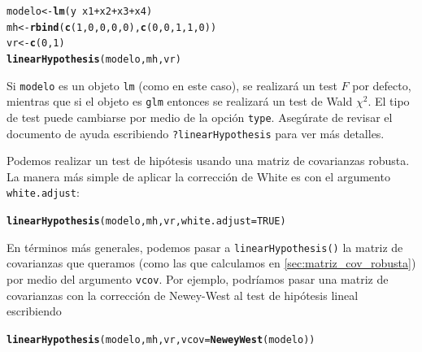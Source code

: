 \documentclass{article}\usepackage[]{graphicx}\usepackage[]{color}
\makeatletter
\newcommand{\hlnum}[1]{\textcolor[rgb]{0.686,0.059,0.569}{#1}}%
\newcommand{\hlopt}[1]{\textcolor[rgb]{0,0,0}{#1}}%
\newcommand{\hlstd}[1]{\textcolor[rgb]{0.345,0.345,0.345}{#1}}%
\newcommand{\hlkwb}[1]{\textcolor[rgb]{0.69,0.353,0.396}{#1}}%
\newcommand{\hlkwc}[1]{\textcolor[rgb]{0.333,0.667,0.333}{#1}}%
\newcommand{\hlkwd}[1]{\textcolor[rgb]{0.737,0.353,0.396}{\textbf{#1}}}%
\newenvironment{kframe}{%
 \def\at@end@of@kframe{}%
 \ifinner\ifhmode%
  \def\at@end@of@kframe{\end{minipage}}%
  \begin{minipage}{\columnwidth}%
 \fi\fi%
 \def\FrameCommand##1{\hskip\@totalleftmargin \hskip-\fboxsep
 \colorbox{shadecolor}{##1}\hskip-\fboxsep
     \hskip-\linewidth \hskip-\@totalleftmargin \hskip\columnwidth}%
 \MakeFramed {\advance\hsize-\width
   \@totalleftmargin\z@ \linewidth\hsize
   \@setminipage}}%
 {\par\unskip\endMakeFramed%
 \at@end@of@kframe}
\newenvironment{knitrout}{}{} %
\makeatother
\begin{document}
\begin{knitrout}
\color{fgcolor}\begin{kframe}
\begin{alltt}
\hlstd{modelo} \hlkwb{<-} \hlkwd{lm}\hlstd{(y} \hlopt{~} \hlstd{x1} \hlopt{+} \hlstd{x2} \hlopt{+} \hlstd{x3} \hlopt{+} \hlstd{x4)}
\hlstd{mh} \hlkwb{<-} \hlkwd{rbind}\hlstd{(}\hlkwd{c}\hlstd{(}\hlnum{1}\hlstd{,}\hlnum{0}\hlstd{,}\hlnum{0}\hlstd{,}\hlnum{0}\hlstd{,}\hlnum{0}\hlstd{),} \hlkwd{c}\hlstd{(}\hlnum{0}\hlstd{,}\hlnum{0}\hlstd{,}\hlnum{1}\hlstd{,}\hlnum{1}\hlstd{,}\hlnum{0}\hlstd{))}
\hlstd{vr} \hlkwb{<-} \hlkwd{c}\hlstd{(}\hlnum{0}\hlstd{,}\hlnum{1}\hlstd{)}
\hlkwd{linearHypothesis}\hlstd{(modelo, mh, vr)}
\end{alltt}
\end{kframe}
\end{knitrout}

Si \verb|modelo| es un objeto \verb|lm| (como en este caso), se realizará un test $F$ por defecto, mientras que si el objeto es \verb|glm| entonces se realizará un test de Wald $\chi^2$. El tipo de test puede cambiarse por medio de la opción \verb|type|. Asegúrate de revisar el documento de ayuda escribiendo \verb|?linearHypothesis| para ver más detalles.

Podemos realizar un test de hipótesis usando una matriz de covarianzas robusta. La manera más simple de aplicar la corrección de White es con el argumento \verb|white.adjust|:

\begin{knitrout}
\color{fgcolor}\begin{kframe}
\begin{alltt}
\hlkwd{linearHypothesis}\hlstd{(modelo, mh, vr,} \hlkwc{white.adjust} \hlstd{=} \hlnum{TRUE}\hlstd{)}
\end{alltt}
\end{kframe}
\end{knitrout}

En términos más generales, podemos pasar a \verb|linearHypothesis()| la matriz de covarianzas que queramos (como las que calculamos en \ref{sec:matriz_cov_robusta}) por medio del argumento \verb|vcov|. Por ejemplo, podríamos pasar una matriz de covarianzas con la corrección de Newey-West al test de hipótesis lineal escribiendo

\begin{knitrout}
\color{fgcolor}\begin{kframe}
\begin{alltt}
\hlkwd{linearHypothesis}\hlstd{(modelo, mh, vr,} \hlkwc{vcov} \hlstd{=} \hlkwd{NeweyWest}\hlstd{(modelo))}
\end{alltt}
\end{kframe}
\end{knitrout}
\end{document}
